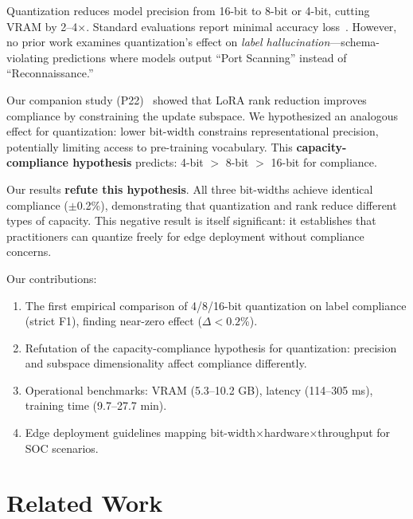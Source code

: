 \documentclass[journal]{IEEEtran}
\begin{document}
Quantization reduces model precision from 16-bit to 8-bit or 4-bit, cutting VRAM by 2--4$\times$. Standard evaluations report minimal accuracy loss~\cite{dettmers2022}. However, no prior work examines quantization's effect on \emph{label hallucination}---schema-violating predictions where models output ``Port Scanning'' instead of ``Reconnaissance.''

Our companion study (P22)~\cite{p22} showed that LoRA rank reduction improves compliance by constraining the update subspace. We hypothesized an analogous effect for quantization: lower bit-width constrains representational precision, potentially limiting access to pre-training vocabulary. This \textbf{capacity-compliance hypothesis} predicts: 4-bit $>$ 8-bit $>$ 16-bit for compliance.

Our results \textbf{refute this hypothesis}. All three bit-widths achieve identical compliance ($\pm$0.2\%), demonstrating that quantization and rank reduce different types of capacity. This negative result is itself significant: it establishes that practitioners can quantize freely for edge deployment without compliance concerns.

Our contributions:
\begin{enumerate}
\item The first empirical comparison of 4/8/16-bit quantization on label compliance (strict F1), finding near-zero effect ($\Delta < 0.2$\%).
\item Refutation of the capacity-compliance hypothesis for quantization: precision and subspace dimensionality affect compliance differently.
\item Operational benchmarks: VRAM (5.3--10.2 GB), latency (114--305 ms), training time (9.7--27.7 min).
\item Edge deployment guidelines mapping bit-width$\times$hardware$\times$throughput for SOC scenarios.
\end{enumerate}

\section{Related Work}
\end{document}
